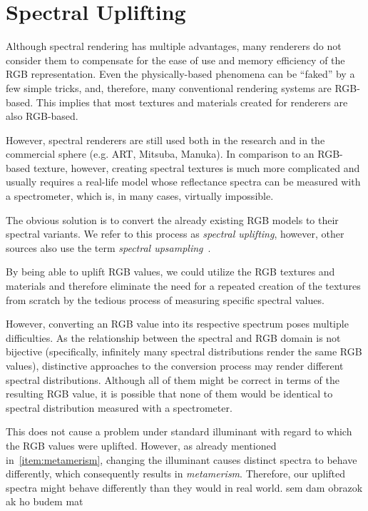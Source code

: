 \chapter{Spectral Uplifting}

Although spectral rendering has multiple advantages, many renderers do not consider them to compensate for the ease of use and memory efficiency of the RGB representation. Even the physically-based phenomena can be ``faked'' by a few simple tricks, and, therefore, many conventional rendering systems are RGB-based. This implies that most textures and materials created for renderers are also RGB-based.

However, spectral renderers are still used both in the research and in the commercial sphere (e.g. ART, Mitsuba, Manuka). In comparison to an RGB-based texture, however, creating spectral textures is much more complicated and usually requires a real-life model whose reflectance spectra can be measured with a spectrometer, which is, in many cases, virtually impossible. 

The obvious solution is to convert the already existing RGB models to their spectral variants. We refer to this process as \emph{spectral uplifting}, however, other sources also use the term \emph{spectral upsampling}~\cite{sigmoidMethod}. 

By being able to uplift RGB values, we could utilize the RGB textures and materials and therefore eliminate the need for a repeated creation of the textures from scratch by the tedious process of measuring specific spectral values.

However, converting an RGB value into its respective spectrum poses multiple difficulties. As the relationship between the spectral and RGB domain is not bijective (specifically, infinitely many spectral distributions render the same RGB values), distinctive approaches to the conversion process may render different spectral distributions. Although all of them might be correct in terms of the resulting RGB value, it is possible that none of them would be identical to spectral distribution measured with a spectrometer.

This does not cause a problem under standard illuminant with regard to which the RGB values were uplifted. However, as already mentioned in~\cref{item:metamerism}, changing the illuminant causes distinct spectra to behave differently, which consequently results in \emph{metamerism}. Therefore, our uplifted spectra might behave differently than they would in real world. sem dam obrazok ak ho budem mat

